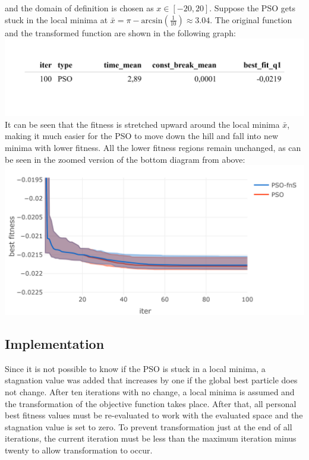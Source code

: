 \documentclass[
  oneside]{book}
\begin{document}
and the domain of definition is chosen as \(x \in [-20, 20]\). Suppose the PSO gets stuck in the local minima at \(\bar{x} = \pi - \text{arcsin}(\frac{1}{10}) \approx 3.04\). The original function and the transformed function are shown in the following graph:
\includegraphics{Master_Thesis_files/figure-latex/unnamed-chunk-9-1.png}
It can be seen that the fitness is stretched upward around the local minima \(\bar{x}\), making it much easier for the PSO to move down the hill and fall into new minima with lower fitness. All the lower fitness regions remain unchanged, as can be seen in the zoomed version of the bottom diagram from above:
\includegraphics{Master_Thesis_files/figure-latex/unnamed-chunk-10-1.png}

\hypertarget{implementation}{%
\subsection{Implementation}\label{implementation}}

Since it is not possible to know if the PSO is stuck in a local minima, a stagnation value was added that increases by one if the global best particle does not change. After ten iterations with no change, a local minima is assumed and the transformation of the objective function takes place. After that, all personal best fitness values must be re-evaluated to work with the evaluated space and the stagnation value is set to zero. To prevent transformation just at the end of all iterations, the current iteration must be less than the maximum iteration minus twenty to allow transformation to occur.
\end{document}
